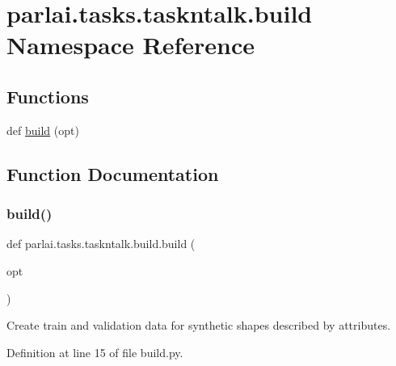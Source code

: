 \hypertarget{namespaceparlai_1_1tasks_1_1taskntalk_1_1build}{}\section{parlai.\+tasks.\+taskntalk.\+build Namespace Reference}
\label{namespaceparlai_1_1tasks_1_1taskntalk_1_1build}
\subsection*{Functions}
\begin{DoxyCompactItemize}
\item 
def \hyperlink{namespaceparlai_1_1tasks_1_1taskntalk_1_1build_a92a0de8038feadf9e3980d7ad49f2083}{build} (opt)
\end{DoxyCompactItemize}


\subsection{Function Documentation}
\mbox{\label{namespaceparlai_1_1tasks_1_1taskntalk_1_1build_a92a0de8038feadf9e3980d7ad49f2083}} 
\subsubsection{\texorpdfstring{build()}{build()}}
{\footnotesize\ttfamily def parlai.\+tasks.\+taskntalk.\+build.\+build (\begin{DoxyParamCaption}\item[{}]{opt }\end{DoxyParamCaption})}

\begin{DoxyVerb}Create train and validation data for synthetic shapes described by attributes.
\end{DoxyVerb}
 

Definition at line 15 of file build.\+py.


